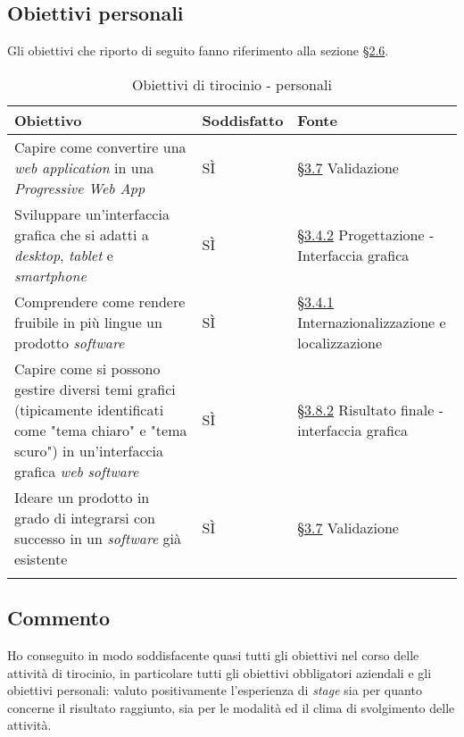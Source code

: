 \subsection{Obiettivi personali}
Gli obiettivi che riporto di seguito fanno riferimento alla sezione \hyperref[sec:obiettivi-personali]{§2.6}.

\begin{longtable}{>{\centering\arraybackslash}m{}>{\centering\arraybackslash}m{}>{\centering\arraybackslash}m{}}
    \hline
    \rowcolor{black}
    \color{white}\textbf{Obiettivo} & \color{white}\textbf{Soddisfatto} & \color{white}\textbf{Fonte} \\
    \hline
    \endhead %
    Capire come convertire una \textit{web application} in una \textit{Progressive Web App} & SÌ & \hyperref[sec:validazione]{§3.7} Validazione \\
    \hline
    Sviluppare un'interfaccia grafica che si adatti a \textit{desktop}, \textit{tablet} e \textit{smartphone} & SÌ & \hyperref[subsec:interfaccia]{§3.4.2} Progettazione - Interfaccia grafica \\
    \hline
    Comprendere come rendere fruibile in più lingue un prodotto \textit{software} & SÌ & \hyperref[subsec:internazionalizzazione]{§3.4.1} Internazionalizzazione e localizzazione \\
    \hline
    Capire come si possono gestire diversi temi grafici (tipicamente identificati come "tema chiaro" e "tema scuro") in un'interfaccia grafica \textit{web} \textit{software} & SÌ & \hyperref[subsec:interfaccia-risultato]{§3.8.2} Risultato finale - interfaccia grafica \\
    \hline
    Ideare un prodotto in grado di integrarsi con successo in un \textit{software} già esistente & SÌ & \hyperref[sec:validazione]{§3.7} Validazione \\
    \hline
    \caption{Obiettivi di tirocinio - personali}
\end{longtable}

\subsection*{Commento}
Ho conseguito in modo soddisfacente quasi tutti gli obiettivi nel corso delle attività di tirocinio, in particolare tutti gli obiettivi obbligatori aziendali e gli obiettivi personali: valuto positivamente l'esperienza di \textit{stage} sia per quanto concerne il risultato raggiunto, 
sia per le modalità ed il clima di svolgimento delle attività.

